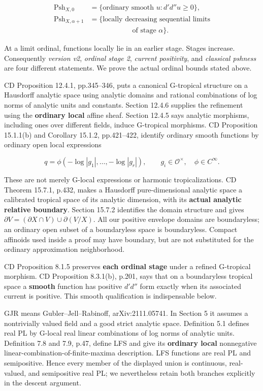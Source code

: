 \documentclass[
  11pt,
]{article}
\begin{document}
\[
\begin{aligned}
\operatorname{Psh}_{X,0}&=\{\text{ordinary smooth }u:d'd''u\geq0\},\\
\operatorname{Psh}_{X,\alpha+1}&=\{\text{locally decreasing sequential limits}\\
&\hspace{6em}\text{of stage }\alpha\}.
\end{aligned}
\]

At a limit ordinal, functions locally lie in an earlier stage. Stages
increase. Consequently \emph{version v2}, \emph{ordinal stage 2},
\emph{current positivity}, and \emph{classical pshness} are four
different statements. We prove the actual ordinal bounds stated above.

CD Proposition 12.4.1, pp.345--346, puts a canonical G-tropical
structure on a Hausdorff analytic space using analytic domains and
rational combinations of log norms of analytic units and constants.
Section 12.4.6 supplies the refinement using the \textbf{ordinary local}
affine sheaf. Section 12.4.5 says analytic morphisms, including ones
over different fields, induce G-tropical morphisms. CD Proposition
15.1.1(b) and Corollary 15.1.2, pp.421--422, identify ordinary smooth
functions by ordinary open local expressions

\[
q=\phi(-\log|g_1|,\ldots,-\log|g_r|),\qquad g_i\in\mathcal O^\times,\quad\phi\in C^\infty.
\]

These are not merely G-local expressions or harmonic tropicalizations.
CD Theorem 15.7.1, p.432, makes a Hausdorff pure-dimensional analytic
space a calibrated tropical space of its analytic dimension, with its
\textbf{actual analytic relative boundary}. Section 15.7.2 identifies
the domain structure and gives
\(\partial V=(\partial X\cap V)\cup\partial(V/X)\). All our positive
envelope domains are boundaryless; an ordinary open subset of a
boundaryless space is boundaryless. Compact affinoids used inside a
proof may have boundary, but are not substituted for the ordinary
approximation neighborhood.

CD Proposition 8.1.5 preserves \textbf{each ordinal stage} under a
refined G-tropical morphism. CD Proposition 8.3.1(b), p.201, says that
on a boundaryless tropical space a \textbf{smooth} function has positive
\(d'd''\) form exactly when its associated current is positive. This
smooth qualification is indispensable below.

GJR means Gubler--Jell--Rabinoff, arXiv:2111.05741. In Section 5 it
assumes a nontrivially valued field and a good strict analytic space.
Definition 5.1 defines real PL by G-local real linear combinations of
log norms of analytic units. Definition 7.8 and 7.9, p.47, define LFS
and give its \textbf{ordinary local} nonnegative
linear-combination-of-finite-maxima description. LFS functions are real
PL and semipositive. Hence every member of the displayed union is
continuous, real-valued, and semipositive real PL; we nevertheless
retain both branches explicitly in the descent argument.
\end{document}
